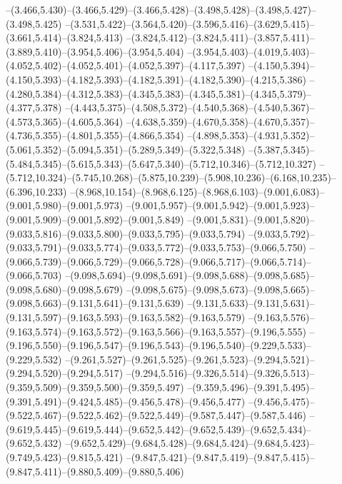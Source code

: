   --(3.466,5.430)--(3.466,5.429)--(3.466,5.428)--(3.498,5.428)--(3.498,5.427)--(3.498,5.425)%
  --(3.531,5.422)--(3.564,5.420)--(3.596,5.416)--(3.629,5.415)--(3.661,5.414)--(3.824,5.413)%
  --(3.824,5.412)--(3.824,5.411)--(3.857,5.411)--(3.889,5.410)--(3.954,5.406)--(3.954,5.404)%
  --(3.954,5.403)--(4.019,5.403)--(4.052,5.402)--(4.052,5.401)--(4.052,5.397)--(4.117,5.397)%
  --(4.150,5.394)--(4.150,5.393)--(4.182,5.393)--(4.182,5.391)--(4.182,5.390)--(4.215,5.386)%
  --(4.280,5.384)--(4.312,5.383)--(4.345,5.383)--(4.345,5.381)--(4.345,5.379)--(4.377,5.378)%
  --(4.443,5.375)--(4.508,5.372)--(4.540,5.368)--(4.540,5.367)--(4.573,5.365)--(4.605,5.364)%
  --(4.638,5.359)--(4.670,5.358)--(4.670,5.357)--(4.736,5.355)--(4.801,5.355)--(4.866,5.354)%
  --(4.898,5.353)--(4.931,5.352)--(5.061,5.352)--(5.094,5.351)--(5.289,5.349)--(5.322,5.348)%
  --(5.387,5.345)--(5.484,5.345)--(5.615,5.343)--(5.647,5.340)--(5.712,10.346)--(5.712,10.327)%
  --(5.712,10.324)--(5.745,10.268)--(5.875,10.239)--(5.908,10.236)--(6.168,10.235)--(6.396,10.233)%
  --(8.968,10.154)--(8.968,6.125)--(8.968,6.103)--(9.001,6.083)--(9.001,5.980)--(9.001,5.973)%
  --(9.001,5.957)--(9.001,5.942)--(9.001,5.923)--(9.001,5.909)--(9.001,5.892)--(9.001,5.849)%
  --(9.001,5.831)--(9.001,5.820)--(9.033,5.816)--(9.033,5.800)--(9.033,5.795)--(9.033,5.794)%
  --(9.033,5.792)--(9.033,5.791)--(9.033,5.774)--(9.033,5.772)--(9.033,5.753)--(9.066,5.750)%
  --(9.066,5.739)--(9.066,5.729)--(9.066,5.728)--(9.066,5.717)--(9.066,5.714)--(9.066,5.703)%
  --(9.098,5.694)--(9.098,5.691)--(9.098,5.688)--(9.098,5.685)--(9.098,5.680)--(9.098,5.679)%
  --(9.098,5.675)--(9.098,5.673)--(9.098,5.665)--(9.098,5.663)--(9.131,5.641)--(9.131,5.639)%
  --(9.131,5.633)--(9.131,5.631)--(9.131,5.597)--(9.163,5.593)--(9.163,5.582)--(9.163,5.579)%
  --(9.163,5.576)--(9.163,5.574)--(9.163,5.572)--(9.163,5.566)--(9.163,5.557)--(9.196,5.555)%
  --(9.196,5.550)--(9.196,5.547)--(9.196,5.543)--(9.196,5.540)--(9.229,5.533)--(9.229,5.532)%
  --(9.261,5.527)--(9.261,5.525)--(9.261,5.523)--(9.294,5.521)--(9.294,5.520)--(9.294,5.517)%
  --(9.294,5.516)--(9.326,5.514)--(9.326,5.513)--(9.359,5.509)--(9.359,5.500)--(9.359,5.497)%
  --(9.359,5.496)--(9.391,5.495)--(9.391,5.491)--(9.424,5.485)--(9.456,5.478)--(9.456,5.477)%
  --(9.456,5.475)--(9.522,5.467)--(9.522,5.462)--(9.522,5.449)--(9.587,5.447)--(9.587,5.446)%
  --(9.619,5.445)--(9.619,5.444)--(9.652,5.442)--(9.652,5.439)--(9.652,5.434)--(9.652,5.432)%
  --(9.652,5.429)--(9.684,5.428)--(9.684,5.424)--(9.684,5.423)--(9.749,5.423)--(9.815,5.421)%
  --(9.847,5.421)--(9.847,5.419)--(9.847,5.415)--(9.847,5.411)--(9.880,5.409)--(9.880,5.406)%
